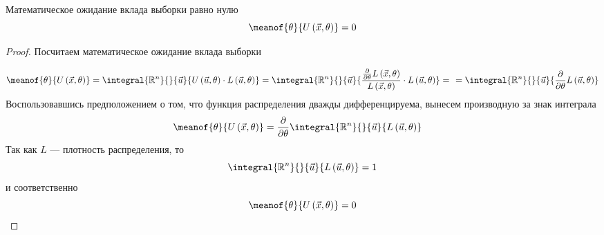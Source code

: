 \begin{lemma}\label{remark:expectationU}
  Математическое ожидание вклада выборки равно нулю
  \begin{equation*}
    \meanof{\theta}{U\left( \vec{x}, \theta \right)} = 0
  \end{equation*}
\end{lemma}
\begin{proof}
Посчитаем математическое ожидание вклада выборки

\begin{align*}
  \meanof{\theta}{U\left( \vec{x}, \theta \right)}
    = \integral{\mathbb{R}^n}{}{\vec{u}}
      {U\left( \vec{u}, \theta \right)
        \cdot L\left( \vec{u}, \theta \right)}
    = \integral{\mathbb{R}^n}{}{\vec{u}}
      {\frac{\frac{\partial}{\partial\theta}L\left(\vec{x}, \theta\right)}
        {L\left(\vec{x}, \theta\right)}
        \cdot L\left( \vec{u}, \theta \right)} = \ \
    = \integral{\mathbb{R}^n}{}{\vec{u}}{\frac{\partial}{\partial\theta}
      L\left( \vec{u}, \theta \right)}
\end{align*}
Воспользовавшись предположением о том,
что функция распределения дважды дифференцируема,
вынесем производную за знак интеграла
\begin{align*}
  \meanof{\theta}{U\left( \vec{x},\theta \right)}
    &= \frac{\partial}{\partial\theta}
      \integral{\mathbb{R}^n}{}{\vec{u}}{L\left( \vec{u},\theta \right)}
\end{align*}
Так как $L$ --- плотность распределения, то
\begin{equation*}
  \integral{\mathbb{R}^n}{}{\vec{u}}{L\left( \vec{u}, \theta \right)} = 1
\end{equation*}
и соответственно
\begin{equation*}
  \meanof{\theta}{U\left( \vec{x}, \theta \right)} = 0
\end{equation*}
\end{proof}

\begin{comment}
\begin{remark}\label{remark:partialLikelihoodNull}
  Частная производная по параметру $\theta$ от функции правдоподобия
  $L\left( \vec{u},\theta \right)$ равна нулю.
\end{remark}
\begin{proof}
  Выше у нас было равенство
  $$\frac{\partial}{\partial\theta}
    \integral{\mathbb{R}^n}{}{\vec{u}}{L\left( \vec{u},\theta \right)}=0$$

  Так как производную можем заносить под знак интеграла
  (согласно замечанию \ref{remark:doubleDiff}), то получаем такое равенство
  $$\integral{\mathbb{R}^n}{}{\vec{u}}{
    \frac{\partial}{\partial\theta}L\left( \vec{u},\theta \right)}=0$$

  Поскольку интеграл не зависит от $\theta$,
  то такое возможно лишь в том случае, когда производная равна нулю
  $$\frac{\partial}{\partial\theta}L\left( \vec{u},\theta \right)=0$$
\end{proof}
\end{comment}

